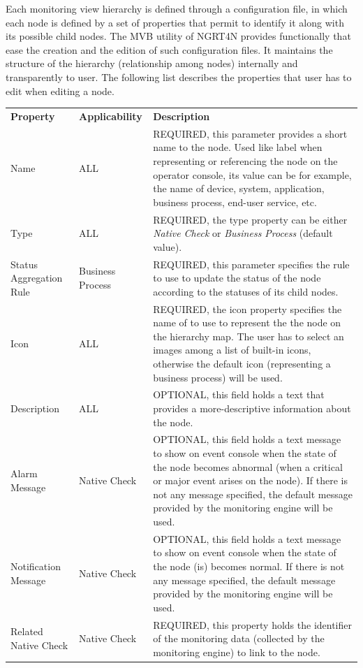 \documentclass[a4paper,9pt]{article}
\begin{document}
Each monitoring view hierarchy is defined through a configuration file, in which each node is defined by a set of properties that permit to identify it along with its possible child nodes. The MVB utility of NGRT4N provides functionally that ease the creation and the edition of such  configuration files. It maintains the structure of the hierarchy (relationship among nodes) internally and transparently to user. The following list describes the properties that user has to edit when editing a node.  

\begin{center}
        \begin{tabular}{p{3cm} p{3cm} p{20cm}}
        {\bf Property} & {\bf Applicability} & {\bf Description}\\
        Name & ALL & REQUIRED, this parameter provides a short name to the node. Used like label when representing or referencing the node on the operator console, its value can be for example, the name of device, system, application, business process, end-user service, etc. \\ 
        Type & ALL & REQUIRED, the type property can be either \emph{Native Check} or \emph{Business Process} (default value).\\ 
        Status Aggregation Rule & Business Process & REQUIRED, this parameter specifies the rule to use to update the status of the node according to the statuses of its child nodes.\\
        Icon & ALL & REQUIRED, the icon property specifies the name of to use to represent the the node on the hierarchy map. The user has to select an images among a list of built-in icons, otherwise the default icon (representing a business process) will be used.\\
        Description & ALL & OPTIONAL, this field holds a text that provides a more-descriptive information about the node. \\ 
        Alarm Message & Native Check & OPTIONAL, this field holds a text message to show on event console when the state of the node becomes abnormal (when a critical or major event arises on the node). If there is not any message specified, the default message provided by the monitoring engine will be used. \\
        Notification Message & Native Check & OPTIONAL, this field holds a text message to show on event console when the state of the node (is) becomes normal. If there is not any message specified, the default message provided by the monitoring engine will be used.\\
        Related Native Check & Native Check & REQUIRED, this property holds the identifier of the monitoring data (collected  by the monitoring engine) to link to the node.\\
        \end{tabular}
\end{center}
\end{document}
